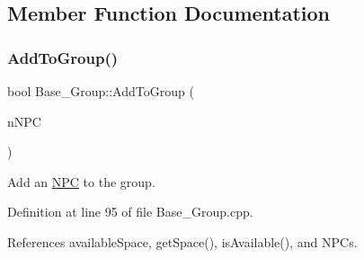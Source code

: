 \subsection{Member Function Documentation}
\mbox{\label{class_base___group_a585d104ef8dfeaf0fdc0b2ef2089a4d1}} 
\subsubsection{\texorpdfstring{Add\+To\+Group()}{AddToGroup()}}
{\footnotesize\ttfamily bool Base\+\_\+\+Group\+::\+Add\+To\+Group (\begin{DoxyParamCaption}\item[{std\+::shared\+\_\+ptr$<$ \hyperlink{class_n_p_c}{N\+PC} $>$}]{n\+N\+PC }\end{DoxyParamCaption})}



Add an \hyperlink{class_n_p_c}{N\+PC} to the group. 



Definition at line 95 of file Base\+\_\+\+Group.\+cpp.



References available\+Space, get\+Space(), is\+Available(), and N\+P\+Cs.


